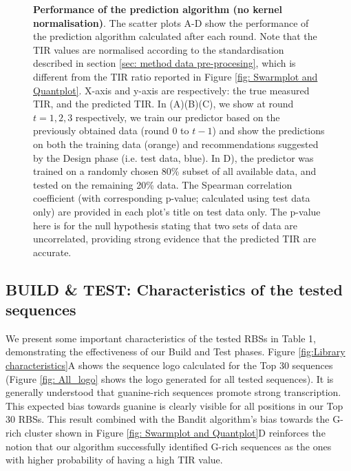 \documentclass{scrartcl}[2013/05/29]%
\begin{document}
\begin{figure}[!ht]
\begin{subfigure}[b]{0.49\textwidth}
    \end{subfigure}
    \caption{\textbf{Performance of the prediction algorithm (no kernel normalisation)}. The scatter plots A-D show the performance of the prediction algorithm calculated after each round.
    Note that the TIR values are normalised according to the standardisation described in section \ref{sec: method data pre-procesing}, which is different from the TIR ratio reported in Figure \ref{fig: Swarmplot and Quantplot}.
    X-axis and y-axis are respectively: the true measured TIR, and the predicted TIR.
    In (A)(B)(C), we show at round $t = 1,2,3$ respectively, we train our predictor based on the previously obtained data (round 0 to $t-1$) and show the predictions on both the training data (orange) and recommendations suggested by the Design phase (i.e. test data, blue).
    In D), the predictor was trained on a randomly chosen 80\% subset of all available data, and tested on the remaining 20\% data.
    The Spearman correlation coefficient (with corresponding p-value; calculated using test data only) are provided in each plot's title on test data only.
    The p-value here is for the null hypothesis stating that two sets of data are uncorrelated, providing strong evidence that the predicted TIR are accurate.
    }
    \label{fig: Scatterplot}
\end{figure}

\subsection{BUILD \& TEST: Characteristics of the tested sequences}
\label{sec:characteristics-of-library}


We present some important characteristics of the tested RBSs in Table 1, demonstrating the effectiveness of our Build and Test phases.
Figure \ref{fig:Library characteristics}A shows the sequence logo calculated for the Top 30 sequences (Figure \ref{fig: All_logo} shows the logo generated for all tested sequences).
It is generally understood that guanine-rich sequences promote strong transcription.
This expected bias towards guanine is clearly visible for all positions in our Top 30 RBSs.
This result combined with the Bandit algorithm's bias towards the G-rich cluster shown in Figure \ref{fig: Swarmplot and Quantplot}D reinforces the notion that our algorithm successfully identified G-rich sequences as the ones with higher probability of having a high TIR value.\\
\end{document}
